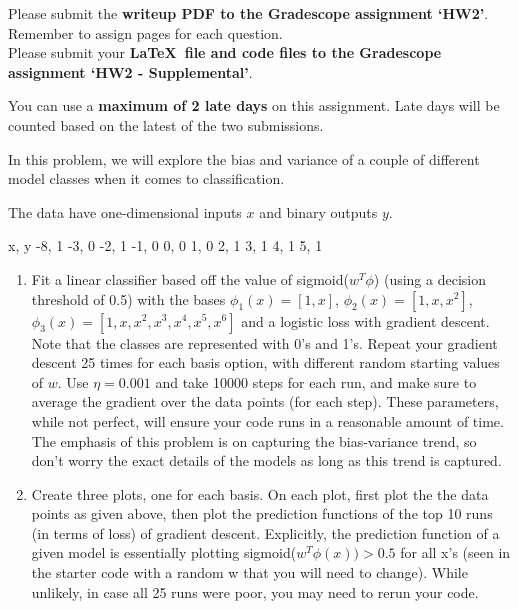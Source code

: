 \documentclass[submit]{harvardml}
\begin{document}
Please submit the \textbf{writeup PDF to the Gradescope assignment `HW2'}. Remember to assign pages for each question. \\

Please submit your \textbf{\LaTeX\ file and code files to the Gradescope assignment `HW2 - Supplemental'}. 

You can use a \textbf{maximum of 2 late days} on this assignment.  Late days will be counted based on the latest of the two submissions. \\

\newpage

\begin{problem}
  In this problem, we will explore the bias and variance of a couple
  of different model classes when it comes to classification.

  The data have one-dimensional inputs $x$ and binary outputs $y$.
  
\begin{csv}
x, y
-8, 1
-3, 0
-2, 1
-1, 0
0, 0
1, 0
2, 1
3, 1
4, 1
5, 1
\end{csv} 

\begin{enumerate}

\item Fit a linear classifier based off the value of sigmoid($w^T \phi$)
 (using a decision threshold of 0.5) with the bases $\phi_1(x) = [1, x]$,
  $\phi_2(x) = [1, x, x^2]$, $\phi_3(x) = [1, x, x^2, x^3, x^4, x^5, x^6]$ and
  a logistic loss with gradient descent. Note that the classes are represented
  with 0's and 1's. 
  Repeat your gradient descent 25 times for each basis option, with different
   random starting values of $w$. Use $\eta=0.001$ and take 10000 steps
   for each run, and make sure to average the gradient over the data points
   (for each step). These parameters, while not perfect, will ensure your code
   runs in a reasonable amount of time. The emphasis of this problem is on
   capturing the bias-variance trend, so don't worry the exact details of the
   models as long as this trend is captured.

\item Create three plots, one for each basis. On each plot, first plot the
  the data points as given above, then plot the prediction functions
  of the top 10 runs (in terms of loss) of gradient descent. Explicitly, 
  the prediction function of a given model is essentially plotting sigmoid($w^T \phi(x)) > 0.5$
  for all x's (seen in the starter code with a random w that you will need to change).
  While unlikely, in case all 25 runs were poor, you may need to rerun your code.
    

\end{enumerate}
\end{problem}
\end{document}
